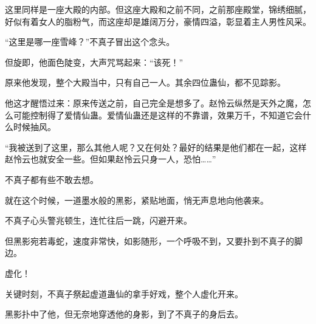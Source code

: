 \begin{this_body}
这里同样是一座大殿的内部。但这座大殿和之前不同，之前那座殿堂，锦绣细腻，好似有着女人的脂粉气，而这座却是雄阔万分，豪情四溢，彰显着主人男性风采。

“这里是哪一座雪峰？”不真子冒出这个念头。

但旋即，他面色陡变，大声咒骂起来：“该死！”

原来他发现，整个大殿当中，只有自己一人。其余四位蛊仙，都不见踪影。

他这才醒悟过来：原来传送之前，自己完全是想多了。赵怜云纵然是天外之魔，怎么可能控制得了爱情仙蛊。爱情仙蛊还是这样的不靠谱，效果万千，不知道它会什么时候抽风。

“我被送到了这里，那么其他人呢？又在何处？最好的结果是他们都在一起，这样赵怜云也就安全一些。但如果赵怜云只身一人，恐怕……”

不真子都有些不敢去想。

就在这个时候，一道墨水般的黑影，紧贴地面，悄无声息地向他袭来。

不真子心头警兆顿生，连忙往后一跳，闪避开来。

但黑影宛若毒蛇，速度非常快，如影随形，一个呼吸不到，又要扑到不真子的脚边。

虚化！

关键时刻，不真子祭起虚道蛊仙的拿手好戏，整个人虚化开来。

黑影扑中了他，但无奈地穿透他的身影，到了不真子的身后去。

\end{this_body}


